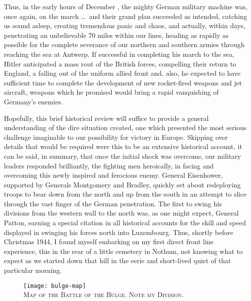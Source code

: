 \documentclass[../m3y]{subfiles}
\begin{document}
Thus, in the early hours of December , the mighty German military machine was, once again, on the march \ldots\ and their grand plan succeeded as intended, catching us sound asleep, creating tremendous panic and chaos, and actually, within days, penetrating an unbelievable 70 miles within our lines, heading as rapidly as possible for the complete severance of our northern and southern armies through reaching the sea at Antwerp. If successful in completing his march to the sea, Hitler anticipated a mass rout of the British forces, compelling their return to England, a falling out of the uniform allied front and, also, he expected to have sufficient time to complete the development of new rocket-fired weapons and jet aircraft, weapons which he promised would bring a rapid vanquishing of Germany's enemies.

Hopefully, this brief historical review will suffice to provide a general understanding of the dire situation created, one which presented the most serious challenge imaginable to our possibility for victory in Europe. Skipping over details that would be required were this to be an extensive historical account, it can be said, in summary, that once the initial shock was overcome, our military leaders responded brilliantly, the fighting men heroically, in facing and overcoming this newly inspired and ferocious enemy. General Eisenhower, supported by Generals Montgomery and Bradley, quickly set about redeploying troops to bear down from the north and up from the south in an attempt to slice through the vast finger of the German penetration. The first to swing his divisions from the western wall to the north was, as one might expect, General Patton, earning a special citation in all historical accounts for the skill and speed displayed in swinging his forces north into Luxembourg. Thus, shortly before Christmas 1944, I found myself embarking on my first direct front line experience, this in the rear of a little cemetery in Nothum,  not knowing what to expect as we started down that hill in the eerie and short-lived quiet of that particular morning.

\begin{figure}[p]
\centering
\texttt{[image: bulge-map]}\\
\medskip
{\newtimes\textsc{Map of the Battle of the Bulge. Note my Division.}}
\end{figure}
\end{document}
